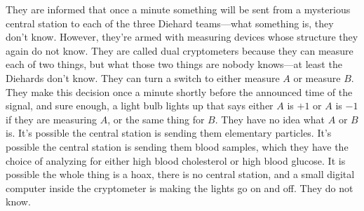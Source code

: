 \documentclass[twocolumn,prb]{revtex4}
\begin{document}
They are informed that once a minute something will be sent from a mysterious central station to each of the three Diehard teams---what something is, they don't know. However, they're armed with measuring devices whose structure they again do not know. They are called dual cryptometers because they can measure each of two things, but what those two things are nobody knows---at least the Diehards don't know. They can turn a switch to either measure $A$ or measure $B$. They make this decision once a minute shortly before the announced time of the signal, and sure enough, a light bulb lights up that says either $A$ is $+1$ or $A$ is $-1$ if they are measuring $A$, or the same thing for $B$. They have no idea what $A$ or $B$ is. It's possible the central station is sending them elementary particles. It's possible the central station is sending them blood samples, which they have the choice of analyzing for either high blood cholesterol or high blood glucose. It is possible the whole thing is a hoax, there is no central station, and a small digital computer inside the cryptometer is making the lights go on and off. They do not know.
\end{document}
